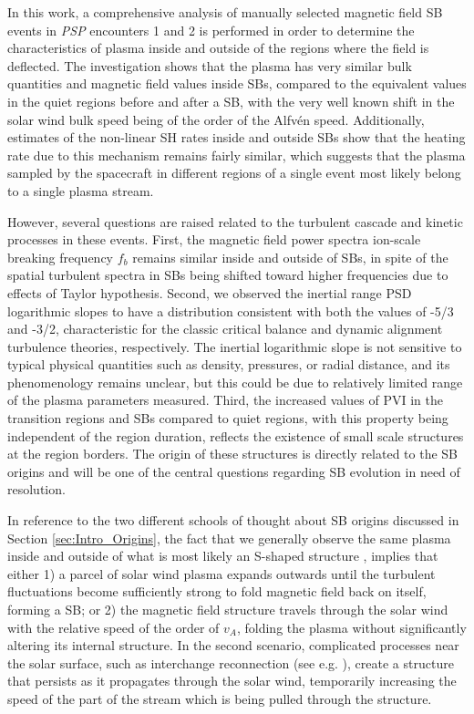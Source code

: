 \documentclass[]{aastex62}
\begin{document}
In this work, a comprehensive analysis of manually selected magnetic field SB events in \emph{PSP} encounters 1 and 2 is performed in order to determine the characteristics of plasma inside and outside of the regions where the field is deflected. The investigation shows that the plasma has very similar bulk quantities and magnetic field values inside SBs, compared to the equivalent values in the quiet regions before and after a SB, with the very well known shift in the solar wind bulk speed being of the order of the Alfv\'en speed. Additionally, estimates of the non-linear SH rates inside and outside SBs show that the heating rate due to this mechanism remains fairly similar, which suggests that the plasma sampled by the spacecraft in different regions of a single event most likely belong to a single plasma stream.

However, several questions are raised related to the turbulent cascade and kinetic processes in these events. First, the magnetic field power spectra ion-scale breaking frequency $f_b$ remains similar inside and outside of SBs, in spite of the spatial turbulent spectra in SBs being shifted toward higher frequencies due to effects of Taylor hypothesis. Second, we observed the inertial range PSD logarithmic slopes to have a distribution consistent with both the values of -5/3 and -3/2, characteristic for the classic critical balance and dynamic alignment turbulence theories, respectively. The inertial logarithmic slope is not sensitive to typical physical quantities such as density, pressures, or radial distance, and its phenomenology remains unclear, but this could be due to relatively limited range of the plasma parameters measured. Third, the increased values of PVI in the transition regions and SBs compared to quiet regions, with this property being independent of the region duration, reflects the existence of small scale structures at the region borders. The origin of these structures is directly related to the SB origins and will be one of the central questions regarding SB evolution in need of resolution.

In reference to the two different schools of thought about SB origins discussed in Section \ref{sec:Intro_Origins}, the fact that we generally observe the same plasma inside and outside of what is most likely an S-shaped structure \citep{DudokdeWit_2020_ApJS,Horbury_2020_ApJS}, implies that either 1) a parcel of solar wind plasma expands outwards until the turbulent fluctuations become sufficiently strong to fold magnetic field back on itself, forming a SB; or 2) the magnetic field structure travels through the solar wind with the relative speed of the order of $v_A$, folding the plasma without significantly altering its internal structure. In the second scenario, complicated processes near the solar surface, such as interchange reconnection (see e.g. \cite{Fisk_2020ApJL,Zank_2020_ApJ}), create a structure that persists as it propagates through the solar wind, temporarily increasing the speed of the part of the stream which is being pulled through the structure.
\end{document}

